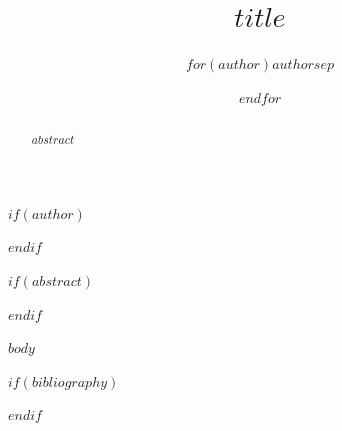 \documentclass[conference,onecolumn]{IEEEtran}
\begin{document}
\title{$title$}
$if(author)$
\author{$for(author)$$author$$sep$ \and $endfor$}
$endif$
\maketitle

$if(abstract)$
\begin{abstract}
$abstract$
\end{abstract}
$endif$

$body$

$if(bibliography)$


$endif$
\end{document}
